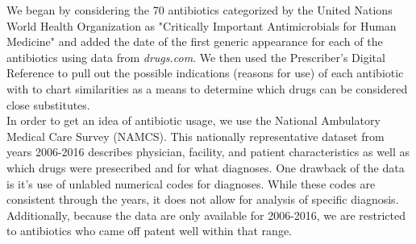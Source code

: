 \documentclass[11pt]{SelfArxOneColBMN}
\begin{document}
\noindent
\indent We began by considering the 70 antibiotics categorized by the United Nations World Health Organization as "Critically Important Antimicrobials for Human Medicine" and added the date of the first generic appearance for each of the antibiotics using data from \textit{drugs.com}. We then used the Prescriber's Digital Reference to pull out the possible indications (reasons for use) of each antibiotic with to chart similarities as a means to determine which drugs can be considered close substitutes.\\

In order to get an idea of antibiotic usage, we use the National Ambulatory Medical Care Survey (NAMCS). This nationally representative dataset from years 2006-2016 describes physician, facility, and patient characteristics as well as which drugs were presecribed and for what diagnoses. One drawback of the data is it's use of unlabled numerical codes for diagnoses. While these codes are consistent through the years, it does not allow for analysis of specific diagnosis. Additionally, because the data are only available for 2006-2016, we are restricted to antibiotics who came off patent well within that range.\\
\end{document}
